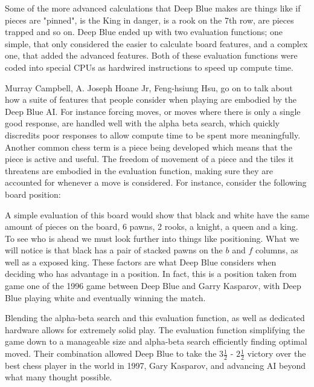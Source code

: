 \documentclass[12pt]{IEEEtran}
\begin{document}
\par Some of the more advanced calculations that Deep Blue makes are things like if pieces are "pinned", is the King in danger, is a rook on the 7th row, are pieces trapped and so on. Deep Blue ended up with two evaluation functions; one simple, that only considered the easier to calculate board features, and a complex one, that added the advanced features. Both of these evaluation functions were coded into special CPUs as hardwired instructions to speed up compute time.\cite{DeepBlue} 

\par Murray Campbell, A. Joseph Hoane Jr, Feng-hsiung Hsu, go on to talk about how a suite of features that people consider when playing are embodied by the Deep Blue AI. For instance forcing moves, or moves where there is only a single good response, are handled well with the alpha beta search, which quickly discredits poor responses to allow compute time to be spent more meaningfully. Another common chess term is a piece being developed which means that the piece is active and useful. The freedom of movement of a piece and the tiles it threatens are embodied in the evaluation function, making sure they are accounted for whenever a move is considered. For instance, consider the following board position: 

\begin{center}
	\medskip
	\newgame
	\scalebox{1.2}{\showboard}
\end{center}

\par A simple evaluation of this board would show that black and white have the same amount of pieces on the board, 6 pawns, 2 rooks, a knight, a queen and a king. To see who is ahead we must look further into things like positioning. What we will notice is that black has a pair of stacked pawns on the $b$ and $f$ columns, as well as a exposed king. These factors are what Deep Blue considers when deciding who has advantage in a position. In fact, this is a position taken from game one of the 1996 game between Deep Blue and Garry Kasparov, with Deep Blue playing white and eventually winning the match. 

 Blending the alpha-beta search and this evaluation function, as well as dedicated hardware allows for extremely solid play. The evaluation function simplifying the game down to a manageable size and alpha-beta search efficiently finding optimal moved. Their combination allowed Deep Blue to take the $3\frac 12$ - $2 \frac 12$ victory over the best chess player in the world in 1997, Gary Kasparov, and advancing AI beyond what many thought possible. 
\end{document}
